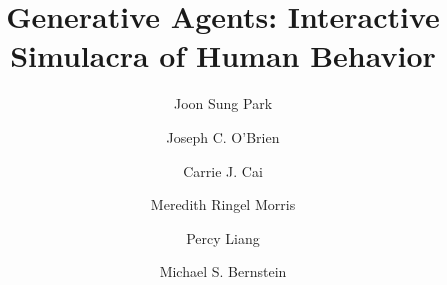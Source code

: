 \documentclass[sigconf]{acmart}
\begin{document}
\title[Generative Agents]{Generative Agents: Interactive Simulacra of Human Behavior}

\author{Joon Sung Park}

\author{Joseph C. O'Brien}

\author{Carrie J. Cai}

\author{Meredith Ringel Morris}

\author{Percy Liang}

\author{Michael S. Bernstein}

\renewcommand{\shortauthors}{J.S. Park, J.C. O'Brien, C.J. Cai, M.R. Morris, P. Liang, M.S. Bernstein}

\newcommand{\gentxt}[1]{{\color{darkgray}\small\fontfamily{}\selectfont
#1}}

\newcommand{\msb}[1]{{\color{blue}{MSB: #1}}}
\newcommand{\lp}[1]{{\color{magenta}{Lindsay: #1}}}
\newcommand{\mlg}[1]{{\color{red}{Mitchell: #1}}}
\newcommand{\joon}[1]{{\color{purple}{#1}}}
\newcommand{\still}[1]{{\color{orange}{#1}}}
\newcommand{\mirev}[1]{{\color{black}{#1}}}

\newcommand{\crdraft}[1]{{\color{black}{#1}}}
\end{document}
